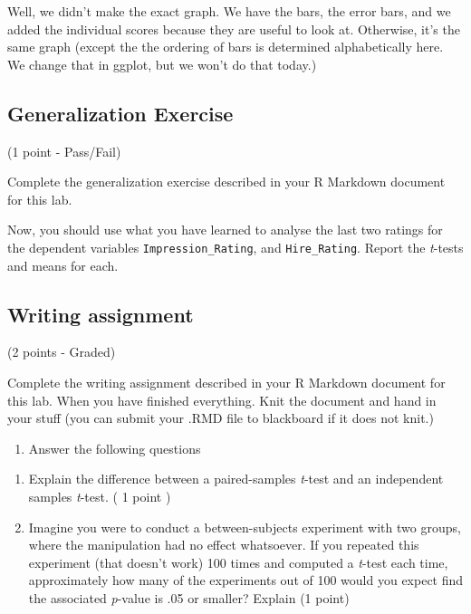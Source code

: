 \documentclass[
]{book}
\providecommand{\tightlist}{%
  \setlength{\itemsep}{0pt}\setlength{\parskip}{0pt}}
\begin{document}
Well, we didn't make the exact graph. We have the bars, the error bars, and we added the individual scores because they are useful to look at. Otherwise, it's the same graph (except the the ordering of bars is determined alphabetically here. We change that in ggplot, but we won't do that today.)

\hypertarget{generalization-exercise-3}{%
\subsection{Generalization Exercise}\label{generalization-exercise-3}}

(1 point - Pass/Fail)

Complete the generalization exercise described in your R Markdown document for this lab.

Now, you should use what you have learned to analyse the last two ratings for the dependent variables \texttt{Impression\_Rating}, and \texttt{Hire\_Rating}. Report the \emph{t}-tests and means for each.

\hypertarget{writing-assignment-3}{%
\subsection{Writing assignment}\label{writing-assignment-3}}

(2 points - Graded)

Complete the writing assignment described in your R Markdown document for this lab. When you have finished everything. Knit the document and hand in your stuff (you can submit your .RMD file to blackboard if it does not knit.)

\begin{enumerate}
\def\labelenumi{\arabic{enumi}.}
\tightlist
\item
  Answer the following questions
\end{enumerate}

\begin{enumerate}
\def\labelenumi{\alph{enumi}.}
\item
  Explain the difference between a paired-samples \emph{t}-test and an independent samples \emph{t}-test. ( 1 point )
\item
  Imagine you were to conduct a between-subjects experiment with two groups, where the manipulation had no effect whatsoever. If you repeated this experiment (that doesn't work) 100 times and computed a \emph{t}-test each time, approximately how many of the experiments out of 100 would you expect find the associated \emph{p}-value is .05 or smaller? Explain (1 point)
\end{enumerate}
\end{document}
